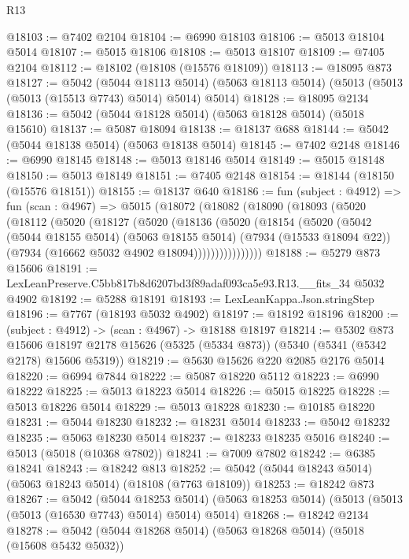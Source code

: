 \begin{lexlean}{R13}
\begin{coremodule}
@18103 := @7402 @2104
@18104 := @6990 @18103
@18106 := @5013 @18104 @5014
@18107 := @5015 @18106
@18108 := @5013 @18107
@18109 := @7405 @2104
@18112 := @18102 (@18108 (@15576 @18109))
@18113 := @18095 @873
@18127 := @5042
    (@5044 @18113 @5014)
    (@5063 @18113 @5014)
    (@5013 (@5013 (@5013 (@15513 @7743) @5014) @5014) @5014)
@18128 := @18095 @2134
@18136 := @5042 (@5044 @18128 @5014) (@5063 @18128 @5014) (@5018 @15610)
@18137 := @5087 @18094
@18138 := @18137 @688
@18144 := @5042 (@5044 @18138 @5014) (@5063 @18138 @5014)
@18145 := @7402 @2148
@18146 := @6990 @18145
@18148 := @5013 @18146 @5014
@18149 := @5015 @18148
@18150 := @5013 @18149
@18151 := @7405 @2148
@18154 := @18144 (@18150 (@15576 @18151))
@18155 := @18137 @640
@18186 := fun (subject : @4912) =>
  fun (scan : @4967) =>
  @5015
    (@18072
      (@18082
        (@18090
          (@18093
            (@5020
              (@18112
                (@5020
                  (@18127
                    (@5020
                      (@18136
                        (@5020
                          (@18154
                            (@5020
                              (@5042
                                (@5044 @18155 @5014)
                                (@5063 @18155 @5014)
                                (@7934 (@15533 @18094 @22))
                                (@7934 (@16662 @5032 @4902 @18094))))))))))))))))
@18188 := @5279 @873 @15606
@18191 := LexLeanPreserve.C5bb817b8d6207bd3f89adaf093ca5e93.R13.__fits_34 @5032 @4902
@18192 := @5288 @18191
@18193 := LexLeanKappa.Json.stringStep
@18196 := @7767 (@18193 @5032 @4902)
@18197 := @18192 @18196
@18200 := (subject : @4912) -> (scan : @4967) -> @18188 @18197
@18214 := @5302
    @873
    @15606
    @18197
    @2178
    @15626
    (@5325 (@5334 @873))
    (@5340 (@5341 (@5342 @2178) @15606 @5319))
@18219 := @5630 @15626 @220 @2085 @2176 @5014
@18220 := @6994 @7844
@18222 := @5087 @18220 @5112
@18223 := @6990 @18222
@18225 := @5013 @18223 @5014
@18226 := @5015 @18225
@18228 := @5013 @18226 @5014
@18229 := @5013 @18228
@18230 := @10185 @18220
@18231 := @5044 @18230
@18232 := @18231 @5014
@18233 := @5042 @18232
@18235 := @5063 @18230 @5014
@18237 := @18233 @18235 @5016
@18240 := @5013 (@5018 (@10368 @7802))
@18241 := @7009 @7802
@18242 := @6385 @18241
@18243 := @18242 @813
@18252 := @5042 (@5044 @18243 @5014) (@5063 @18243 @5014) (@18108 (@7763 @18109))
@18253 := @18242 @873
@18267 := @5042
    (@5044 @18253 @5014)
    (@5063 @18253 @5014)
    (@5013 (@5013 (@5013 (@16530 @7743) @5014) @5014) @5014)
@18268 := @18242 @2134
@18278 := @5042 (@5044 @18268 @5014) (@5063 @18268 @5014) (@5018 (@15608 @5432 @5032))

\end{coremodule}
\end{lexlean}
